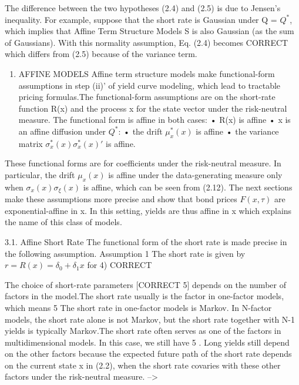 \documentclass[
]{article}
\providecommand{\tightlist}{%
  \setlength{\itemsep}{0pt}\setlength{\parskip}{0pt}}
\begin{document}
The difference between the two hypotheses (2.4) and (2.5) is due to Jensen's inequality.
For example, suppose that the short rate is Gaussian under Q = \(Q^{\ast}\), which implies that
Affine Term Structure Models S is also Gaussian (as the sum of Gaussians). With this normality assumption, Eq. (2.4) becomes CORRECT
which differs from (2.5) because of the variance term.

\begin{enumerate}
\def\labelenumi{\arabic{enumi}.}
\setcounter{enumi}{2}
\tightlist
\item
  AFFINE MODELS
  Affine term structure models make functional-form assumptions in step (ii)' of yield curve modeling, which lead to tractable pricing formulas.The functional-form assumptions are on the short-rate function R(x) and the process x for the state vector under the
  risk-neutral measure. The functional form is affine in both cases:
  • R(x) is affine
  • x is an affine diffusion under \(Q^{\ast}\):
  • the drift \(\mu^{\ast}_x(x)\) is affine
  • the variance matrix \(\sigma^{\ast}_x(x) \sigma^{\ast}_x(x)'\) is affine.
\end{enumerate}

These functional forms are for coefficients under the risk-neutral measure. In particular,
the drift \(\mu_x(x)\) is affine under the data-generating measure only when \(\sigma_x(x) \sigma_\xi(x)\) is
affine, which can be seen from (2.12). The next sections make these assumptions more
precise and show that bond prices \(F(x,\tau)\) are exponential-affine in x. In this setting,
yields are thus affine in x which explains the name of this class of models.

3.1. Affine Short Rate
The functional form of the short rate is made precise in the following assumption.
Assumption 1 The short rate is given by
\(r = R(x) = \delta_0 + \delta_1 x\)
for 4) CORRECT

The choice of short-rate parameters {[}CORRECT 5{]} depends on the number of factors in
the model.The short rate usually is the factor in one-factor models, which means 5 The short rate in one-factor models is Markov. In N-factor models, the
short rate alone is not Markov, but the short rate together with N-1 yields is typically
Markov.The short rate often serves as one of the factors in multidimensional models. In
this case, we still have 5 . Long yields still depend on the other
factors because the expected future path of the short rate depends on the current state
x in (2.2), when the short rate covaries with these other factors under the risk-neutral
measure.
--\textgreater{}
\end{document}
